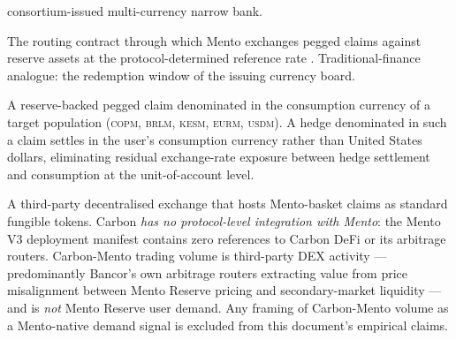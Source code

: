 \begin{description}
        consortium-issued multi-currency narrow bank.
  \item[Mento Broker.] The routing contract through which Mento exchanges
        pegged claims against reserve assets at the protocol-determined
        reference rate \citep{mento_v3_deployments_2026}. Traditional-finance
        analogue: the redemption window of the issuing currency board.
  \item[Purchasing-parity stablecoin.] A reserve-backed pegged claim
        denominated in the consumption currency of a target population
        (\textsc{copm}, \textsc{brlm}, \textsc{kesm}, \textsc{eurm},
        \textsc{usdm}). A hedge denominated in such a claim settles in the
        user's consumption currency rather than United States dollars,
        eliminating residual exchange-rate exposure between hedge settlement
        and consumption at the unit-of-account level.
  \item[Carbon DeFi (excluded).] A third-party decentralised exchange that
        hosts Mento-basket claims as standard fungible tokens. Carbon
        \emph{has no protocol-level integration with Mento}: the Mento V3
        deployment manifest contains zero references to Carbon DeFi or its
        arbitrage routers. Carbon-Mento trading volume is third-party DEX
        activity --- predominantly Bancor's own arbitrage routers extracting
        value from price misalignment between Mento Reserve pricing and
        secondary-market liquidity --- and is \emph{not} Mento Reserve user
        demand. Any framing of Carbon-Mento volume as a Mento-native demand
        signal is excluded from this document's empirical claims.
\end{description}
